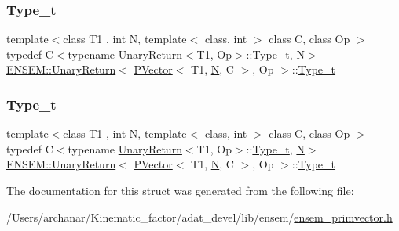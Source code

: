\subsubsection{\texorpdfstring{Type\_t}{Type\_t}\hspace{0.1cm}{\footnotesize\ttfamily [1/2]}}
{\footnotesize\ttfamily template$<$class T1 , int N, template$<$ class, int $>$ class C, class Op $>$ \\
typedef C$<$typename \mbox{\hyperlink{structENSEM_1_1UnaryReturn}{Unary\+Return}}$<$T1, Op$>$\+::\mbox{\hyperlink{structENSEM_1_1UnaryReturn_3_01PVector_3_01T1_00_01N_00_01C_01_4_00_01Op_01_4_a4c77aefad12cfcc1bdbcc457ce10d656}{Type\+\_\+t}}, \mbox{\hyperlink{operator__name__util_8cc_a7722c8ecbb62d99aee7ce68b1752f337}{N}}$>$ \mbox{\hyperlink{structENSEM_1_1UnaryReturn}{E\+N\+S\+E\+M\+::\+Unary\+Return}}$<$ \mbox{\hyperlink{classENSEM_1_1PVector}{P\+Vector}}$<$ T1, \mbox{\hyperlink{operator__name__util_8cc_a7722c8ecbb62d99aee7ce68b1752f337}{N}}, C $>$, Op $>$\+::\mbox{\hyperlink{structENSEM_1_1UnaryReturn_3_01PVector_3_01T1_00_01N_00_01C_01_4_00_01Op_01_4_a4c77aefad12cfcc1bdbcc457ce10d656}{Type\+\_\+t}}}

\mbox{\label{structENSEM_1_1UnaryReturn_3_01PVector_3_01T1_00_01N_00_01C_01_4_00_01Op_01_4_a4c77aefad12cfcc1bdbcc457ce10d656}} 
\subsubsection{\texorpdfstring{Type\_t}{Type\_t}\hspace{0.1cm}{\footnotesize\ttfamily [2/2]}}
{\footnotesize\ttfamily template$<$class T1 , int N, template$<$ class, int $>$ class C, class Op $>$ \\
typedef C$<$typename \mbox{\hyperlink{structENSEM_1_1UnaryReturn}{Unary\+Return}}$<$T1, Op$>$\+::\mbox{\hyperlink{structENSEM_1_1UnaryReturn_3_01PVector_3_01T1_00_01N_00_01C_01_4_00_01Op_01_4_a4c77aefad12cfcc1bdbcc457ce10d656}{Type\+\_\+t}}, \mbox{\hyperlink{operator__name__util_8cc_a7722c8ecbb62d99aee7ce68b1752f337}{N}}$>$ \mbox{\hyperlink{structENSEM_1_1UnaryReturn}{E\+N\+S\+E\+M\+::\+Unary\+Return}}$<$ \mbox{\hyperlink{classENSEM_1_1PVector}{P\+Vector}}$<$ T1, \mbox{\hyperlink{operator__name__util_8cc_a7722c8ecbb62d99aee7ce68b1752f337}{N}}, C $>$, Op $>$\+::\mbox{\hyperlink{structENSEM_1_1UnaryReturn_3_01PVector_3_01T1_00_01N_00_01C_01_4_00_01Op_01_4_a4c77aefad12cfcc1bdbcc457ce10d656}{Type\+\_\+t}}}



The documentation for this struct was generated from the following file\+:\begin{DoxyCompactItemize}
\item 
/\+Users/archanar/\+Kinematic\+\_\+factor/adat\+\_\+devel/lib/ensem/\mbox{\hyperlink{lib_2ensem_2ensem__primvector_8h}{ensem\+\_\+primvector.\+h}}\end{DoxyCompactItemize}
